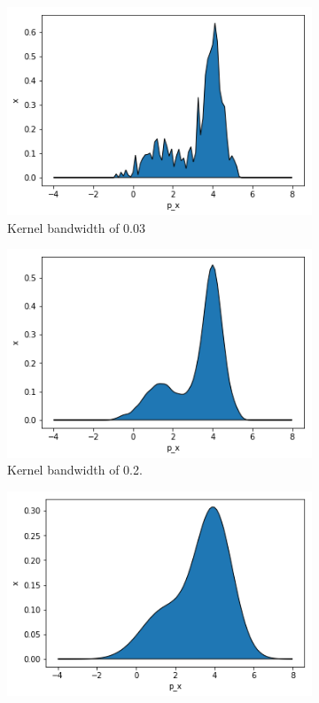 \begin{questions}
\begin{figure}[H]
	\centering
	\begin{subfigure}[b]{0.3\linewidth}
		\includegraphics[width=\linewidth]{pictures/kd003.png}
		\caption{Kernel bandwidth of 0.03}
		\label{fig:kd003}
	\end{subfigure}
	\begin{subfigure}[b]{0.3\linewidth}
		\includegraphics[width=\linewidth]{pictures/kd02.png}
		\caption{Kernel bandwidth of 0.2.}
		\label{fig:kd02}
	\end{subfigure}
	\begin{subfigure}[b]{0.3\linewidth}
	\includegraphics[width=\linewidth]{pictures/kd08.png}

\end{subfigure}
\end{figure}
\end{questions}
